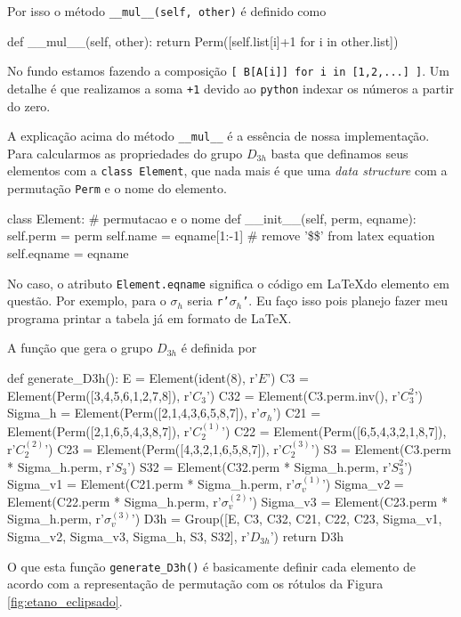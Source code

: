 \documentclass[a4paper,10pt]{article}
\newcommand{\python}[1]{\texttt{#1}}
\begin{document}
Por isso o método \python{__mul__(self, other)} é definido como
\begin{Python}
def __mul__(self, other):
    return Perm([self.list[i]+1 for i in other.list])
\end{Python}

No fundo estamos fazendo a composição \python{[ B[A[i]] for i in [1,2,...] ]}. Um detalhe é que realizamos a soma \python{+1} devido ao \python{python} indexar os números a partir do zero.

A explicação acima do método \python{__mul__} é a essência de nossa implementação. Para calcularmos as propriedades do grupo $D_{3h}$ basta que definamos seus elementos com a \python{class Element}, que nada mais é que uma \textit{data structure} com a permutação \python{Perm} e o nome do elemento.
\begin{Python}
class Element:  # permutacao e o nome
    def __init__(self, perm, eqname):
        self.perm = perm
        self.name = eqname[1:-1]  # remove '\$\$' from latex equation
        self.eqname = eqname
\end{Python}

No caso, o atributo \python{Element.eqname} significa o código em \LaTeX do elemento em questão. Por exemplo, para o $\sigma_h$ seria \python{r'$\sigma_h$'}. Eu faço isso pois planejo fazer meu programa printar a tabela já em formato de \LaTeX.

A função que gera o grupo $D_{3h}$ é definida por
\begin{Python}
def generate_D3h():
    E = Element(ident(8), r'$E$')
    C3 = Element(Perm([3,4,5,6,1,2,7,8]), r'$C_3$')
    C32 = Element(C3.perm.inv(), r'$C_3^2$')
    Sigma_h = Element(Perm([2,1,4,3,6,5,8,7]), r'$\sigma_h$')
    C21 = Element(Perm([2,1,6,5,4,3,8,7]), r'$C_2^{(1)}$')
    C22 = Element(Perm([6,5,4,3,2,1,8,7]), r'$C_2^{(2)}$')
    C23 = Element(Perm([4,3,2,1,6,5,8,7]), r'$C_2^{(3)}$')
    S3 = Element(C3.perm * Sigma_h.perm, r'$S_3$')
    S32 = Element(C32.perm * Sigma_h.perm, r'$S_3^2$')
    Sigma_v1 = Element(C21.perm * Sigma_h.perm, r'$\sigma_v^{(1)}$')
    Sigma_v2 = Element(C22.perm * Sigma_h.perm, r'$\sigma_v^{(2)}$')
    Sigma_v3 = Element(C23.perm * Sigma_h.perm, r'$\sigma_v^{(3)}$')
    D3h = Group([E, C3, C32, C21, C22, C23, Sigma_v1,
                 Sigma_v2, Sigma_v3, Sigma_h, S3, S32], r'$D_{3h}$')
    return D3h
\end{Python}

O que esta função \python{generate_D3h()} é basicamente definir cada elemento de acordo com a representação de permutação com os rótulos da Figura \ref{fig:etano_eclipsado}.
\end{document}
